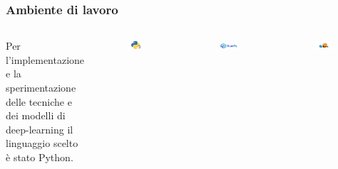 \documentclass{beamer}
\begin{document}
\begin{frame}
	\frametitle{Ambiente di lavoro}
	\begin{columns}
		Per l’implementazione e la sperimentazione delle tecniche e dei modelli 
		di deep-learning il
		linguaggio scelto è stato Python.
		\centering
		\begin{figure}
			\includegraphics[width=0.8\textwidth]{figures/python.PNG}
		\end{figure}
		\begin{figure}
			\includegraphics[width=0.8\textwidth]{figures/index.PNG}
		\end{figure} 
		\bigskip
		\centering
		\bigskip\bigskip\bigskip
		\begin{figure}
			\includegraphics[width=0.8\textwidth]{figures/scikit.PNG}
		\end{figure}

\end{columns}
\end{frame}
\end{document}
